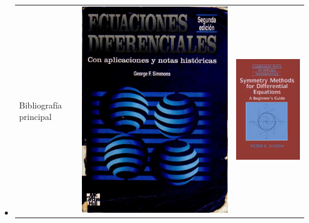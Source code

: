 \documentclass{article}
\begin{document}
\begin{itemize}
 \item  \begin{tabular}{m{4cm} m{2cm} m{2cm}} Bibliografía principal & \includegraphics[scale=0.05]{imagenes/Tapa_Simmons.jpg} &    \includegraphics[scale=0.13]{imagenes/tapa_hydon.png}          \end{tabular}

\end{itemize}
\end{document}
